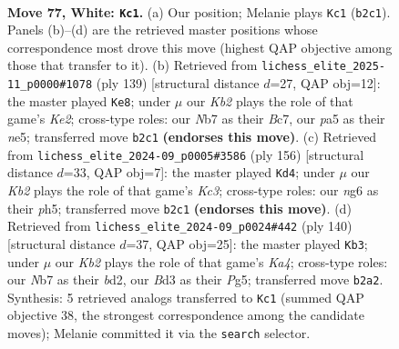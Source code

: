 \documentclass[11pt]{article}
\begin{document}
\clearpage

\begin{figure}[p]\centering
\begin{subfigure}{0.46\textwidth}\centering
\resizebox{\linewidth}{!}{%
\newchessgame
\chessboard[
  setfen={8/1Nn2k2/6n1/p7/Pb1pP3/1P1B3p/1K2P3/8 w - - 20 77},
  showmover=false,
  pgfstyle=straightmove, color=movearrow, markmove={b2-c1}
]}
\caption{}
\end{subfigure}\hfill
\begin{subfigure}{0.46\textwidth}\centering
\resizebox{\linewidth}{!}{%
\newchessgame
\chessboard[
  setfen={8/2b1k3/4p3/1n1bN1pp/N3p3/6PP/1B3P2/6K1 b - - 5 70},
  showmover=false,
  pgfstyle=straightmove, color=movearrow, markmove={e7-e8}
]}
\caption{}
\end{subfigure}
\\[4pt]
\begin{subfigure}{0.46\textwidth}\centering
\resizebox{\linewidth}{!}{%
\newchessgame
\chessboard[
  setfen={8/8/p3pBk1/Pb2P2p/1P5P/2K5/8/8 w - - 38 79},
  showmover=false,
  pgfstyle=straightmove, color=movearrow, markmove={c3-d4}
]}
\caption{}
\end{subfigure}\hfill
\begin{subfigure}{0.46\textwidth}\centering
\resizebox{\linewidth}{!}{%
\newchessgame
\chessboard[
  setfen={8/1k6/1p4p1/1P1pBpP1/K2P1P2/8/3b4/8 w - - 6 71},
  showmover=false,
  pgfstyle=straightmove, color=movearrow, markmove={a4-b3}
]}
\caption{}
\end{subfigure}
\caption{\textbf{Move 77, White: \texttt{Kc1}.} (a) Our position; Melanie plays \texttt{Kc1} (\texttt{b2c1}). Panels (b)--(d) are the retrieved master positions whose correspondence most drove this move (highest QAP objective among those that transfer to it). (b) Retrieved from \texttt{lichess\_elite\_2025-11\_p0000\#1078} (ply 139) [structural distance $d$=27, QAP obj=12]: the master played \texttt{Ke8}; under $\mu$ our \emph{Kb2} plays the role of that game's \emph{Ke2}; cross-type roles: our \emph{N}b7 as their \emph{B}c7, our \emph{p}a5 as their \emph{n}e5; transferred move \texttt{b2c1} \textbf{(endorses this move)}. (c) Retrieved from \texttt{lichess\_elite\_2024-09\_p0005\#3586} (ply 156) [structural distance $d$=33, QAP obj=7]: the master played \texttt{Kd4}; under $\mu$ our \emph{Kb2} plays the role of that game's \emph{Kc3}; cross-type roles: our \emph{n}g6 as their \emph{p}h5; transferred move \texttt{b2c1} \textbf{(endorses this move)}. (d) Retrieved from \texttt{lichess\_elite\_2024-09\_p0024\#442} (ply 140) [structural distance $d$=37, QAP obj=25]: the master played \texttt{Kb3}; under $\mu$ our \emph{Kb2} plays the role of that game's \emph{Ka4}; cross-type roles: our \emph{N}b7 as their \emph{b}d2, our \emph{B}d3 as their \emph{P}g5; transferred move \texttt{b2a2}. Synthesis: 5 retrieved analogs transferred to \texttt{Kc1} (summed QAP objective 38, the strongest correspondence among the candidate moves); Melanie committed it via the \texttt{search} selector.}
\label{fig:thought-m152}
\end{figure}
\end{document}
